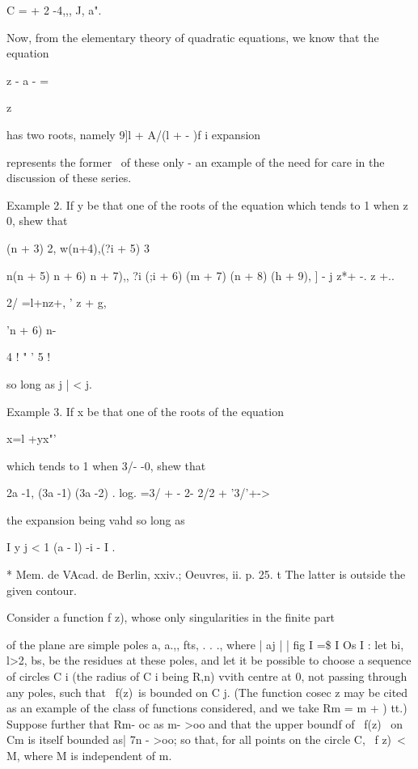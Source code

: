 C = + 2 -4,,, J, a".

Now, from the elementary theory of quadratic equations, we know that
the equation

z - a - =

z

has two roots, namely 9]l + A/(l + - )f i %
expansion

represents the former \ of these only - an example of the need for
care in the discussion of these series.

Example 2. If y be that one of the roots of the equation which tends
to 1 when z~ 0, shew that

 (n + 3) 2, w(n+4),(?i + 5) 3

n(n + 5) n + 6) n + 7),, ?i (;i + 6) (m + 7) (n + 8) (h + 9), ] - j
z*+ -. z +..

2/ =l+nz+, ' z + g,

'n + 6) n-

4 ! " ' 5 !

so long as j | < j.

Example 3. If x be that one of the roots of the equation

x=l +yx"'

which tends to 1 when 3/- -0, shew that

2a -1, (3a -1) (3a -2) . log. =3/ + - 2- 2/2 + '3/'+->

the expansion being vahd so long as

I y j < 1 (a - l) -i - I . 

* Mem. de VAcad. de Berlin, xxiv.; Oeuvres, ii. p. 25. t The latter is
outside the given contour.

%
%


  Consider a function f z), whose only singularities in the finite
part

of the plane are simple poles a, a.,, fts, . . ., where | aj | | fig
I =\$ I Os I   : let bi, l>2, bs,  be the residues at these
poles, and let it be possible to choose a sequence of circles C i (the
radius of C i being R,n) vvith centre at 0, not passing through any
poles, such that \ f(z)\ is bounded on C j. (The function cosec z may
be cited as an example of the class of functions considered, and we
take Rm = m + ) tt.) Suppose further that Rm- oc as m- >oo and that
the upper boundf of \ f(z) \ on Cm is itself bounded as| 7n - >oo; so
that, for all points on the circle C, \ f z)\ < M, where M is
independent of m.


